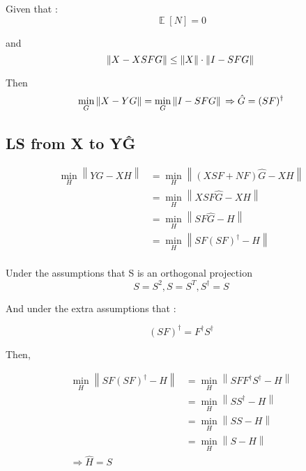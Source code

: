 \documentclass[runningheads]{llncs}
\begin{document}
Given that :
\begin{equation}
\mathop{\mathbb{E}}[N]=0
\end{equation}

and
\begin{equation}
\left \| X-XSFG \right \| \leq \left \| X \right \| \cdot  \left \| I-SFG \right \| \\
\end{equation}

Then
\begin{equation}
\min_G \left \| X-YG \right \| = \min_G \left \| I -SFG\right\| \\
\Rightarrow \hat  G= (SF)^{\dagger}
\end{equation}

\subsection{LS from X to Y\^{G}}

\begin{equation}
\begin{aligned}
\min_H \left \| Y \hat G - XH \right \| &= \min_H \left \| (XSF+NF) \hat G - XH \right \| \\
&= \min_H \left \| XSF \hat G - XH \right \| \\
&= \min_H \left \| SF \hat G - H \right \| \\
&= \min_H \left \| SF (SF)^{\dagger} - H \right \| \\
\end{aligned}
\end{equation}

Under the assumptions that S is an orthogonal projection
\begin{equation}
    S = S^2, S=S^T, S^{\dagger} = S
\end{equation}

And under the extra assumptions that :

\begin{equation}
(SF)^{\dagger} = F^{\dagger} S^{\dagger}
\end{equation}

Then,

\begin{equation}
\begin{aligned}
\min_H \left \| SF (SF)^{\dagger} - H \right \| &= \min_H \left \| SFF^{\dagger}S^{\dagger} - H \right \| \\
&= \min_H \left \| SS^{\dagger} - H \right \| \\
&= \min_H \left \| SS - H \right \| \\
&= \min_H \left \| S - H \right \|\\
\Rightarrow \hat H = S
\end{aligned}
\end{equation}
\end{document}
